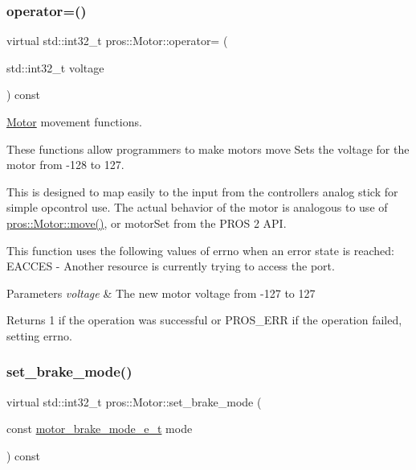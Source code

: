\subsubsection{\texorpdfstring{operator=()}{operator=()}}
{\footnotesize\ttfamily virtual std\+::int32\+\_\+t pros\+::\+Motor\+::operator= (\begin{DoxyParamCaption}\item[{std\+::int32\+\_\+t}]{voltage }\end{DoxyParamCaption}) const\hspace{0.3cm}{\ttfamily [virtual]}}



\mbox{\hyperlink{classpros_1_1Motor}{Motor}} movement functions. 

These functions allow programmers to make motors move Sets the voltage for the motor from -\/128 to 127.

This is designed to map easily to the input from the controller\textquotesingle{}s analog stick for simple opcontrol use. The actual behavior of the motor is analogous to use of \mbox{\hyperlink{classpros_1_1Motor_a7ea9aedd4e12844be2584dc3f4b7a4bf}{pros\+::\+Motor\+::move()}}, or motor\+Set from the P\+R\+OS 2 A\+PI.

This function uses the following values of errno when an error state is reached\+: E\+A\+C\+C\+ES -\/ Another resource is currently trying to access the port.


\begin{DoxyParams}{Parameters}
{\em voltage} & The new motor voltage from -\/127 to 127\\
\hline
\end{DoxyParams}
\begin{DoxyReturn}{Returns}
1 if the operation was successful or P\+R\+O\+S\+\_\+\+E\+RR if the operation failed, setting errno. 
\end{DoxyReturn}
\mbox{\label{classpros_1_1Motor_ab51969169dc534537f79710261daa3dd}} 
\subsubsection{\texorpdfstring{set\_brake\_mode()}{set\_brake\_mode()}}
{\footnotesize\ttfamily virtual std\+::int32\+\_\+t pros\+::\+Motor\+::set\+\_\+brake\+\_\+mode (\begin{DoxyParamCaption}\item[{const \mbox{\hyperlink{motors_8h_aa324a2881696428c9e3684f9ad23a83b}{motor\+\_\+brake\+\_\+mode\+\_\+e\+\_\+t}}}]{mode }\end{DoxyParamCaption}) const\hspace{0.3cm}{\ttfamily [virtual]}}




